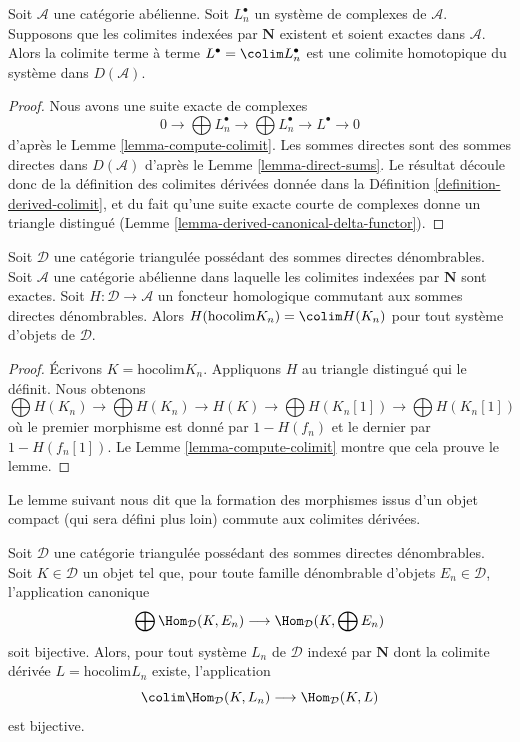 \begin{lemma}
\label{lemma-colim-hocolim}
Soit $\mathcal{A}$ une catégorie abélienne. Soit $L_n^\bullet$ un système de
complexes de $\mathcal{A}$. Supposons que les colimites indexées par
$\mathbf{N}$ existent et soient exactes dans $\mathcal{A}$.
Alors la colimite terme à terme $L^\bullet = \colim L_n^\bullet$ est une
colimite homotopique du système dans $D(\mathcal{A})$.
\end{lemma}

\begin{proof}
Nous avons une suite exacte de complexes
$$
0 \to \bigoplus L_n^\bullet \to \bigoplus L_n^\bullet \to L^\bullet \to 0
$$
d'après le Lemme \ref{lemma-compute-colimit}.
Les sommes directes sont des sommes directes dans $D(\mathcal{A})$ d'après le
Lemme \ref{lemma-direct-sums}.
Le résultat découle donc de la définition des colimites dérivées donnée dans
la Définition \ref{definition-derived-colimit}, et du fait qu'une suite exacte
courte de complexes donne un triangle distingué
(Lemme \ref{lemma-derived-canonical-delta-functor}).
\end{proof}

\begin{lemma}
\label{lemma-cohomology-of-hocolim}
Soit $\mathcal{D}$ une catégorie triangulée possédant des sommes directes
dénombrables. Soit $\mathcal{A}$ une catégorie abélienne dans laquelle les
colimites indexées par $\mathbf{N}$ sont exactes.
Soit $H : \mathcal{D} \to \mathcal{A}$ un foncteur homologique commutant aux
sommes directes dénombrables.
Alors $H(\text{hocolim} K_n) = \colim H(K_n)$ pour tout système d'objets de
$\mathcal{D}$.
\end{lemma}

\begin{proof}
Écrivons $K = \text{hocolim} K_n$. Appliquons $H$ au triangle distingué qui
le définit. Nous obtenons
$$
\bigoplus H(K_n) \to \bigoplus H(K_n)
\to H(K) \to
\bigoplus H(K_n[1]) \to \bigoplus H(K_n[1])
$$
où le premier morphisme est donné par $1 - H(f_n)$ et le dernier par
$1 - H(f_n[1])$.
Le Lemme \ref{lemma-compute-colimit} montre que cela prouve le lemme.
\end{proof}

\noindent
Le lemme suivant nous dit que la formation des morphismes issus d'un objet
compact (qui sera défini plus loin) commute aux colimites dérivées.

\begin{lemma}
\label{lemma-commutes-with-countable-sums}
Soit $\mathcal{D}$ une catégorie triangulée possédant des sommes directes
dénombrables. Soit $K \in \mathcal{D}$ un objet tel que, pour toute famille
dénombrable d'objets $E_n \in \mathcal{D}$, l'application canonique
$$
\bigoplus \Hom_\mathcal{D}(K, E_n)
\longrightarrow
\Hom_\mathcal{D}(K, \bigoplus E_n)
$$
soit bijective. Alors, pour tout système $L_n$ de $\mathcal{D}$ indexé par
$\mathbf{N}$ dont la colimite dérivée $L = \text{hocolim} L_n$ existe,
l'application
$$
\colim \Hom_\mathcal{D}(K, L_n) \longrightarrow \Hom_\mathcal{D}(K, L)
$$
est bijective.
\end{lemma}

